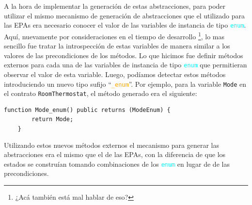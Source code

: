 A la hora de implementar la generación de estas abstracciones, para poder utilizar el mismo mecanismo de generación de abstracciones que el utilizado para las EPAs era necesario conocer el valor de las variables de instancia de tipo \textcolor{cyan}{\texttt{enum}}.
Aquí, nuevamente por consideraciones en el tiempo de desarrollo \footnote{¿Acá también está mal hablar de eso?}, lo mas sencillo fue tratar la introspección de estas variables de manera similar a los valores de las precondiciones de los métodos.
Lo que hicimos fue definir métodos externos para cada una de las variables de instancia de tipo \textcolor{cyan}{\texttt{enum}} que permitieran observar el valor de esta variable.
Luego, podíamos detectar estos métodos introduciendo un nuevo tipo sufijo ``\textcolor{orange}{\texttt{\_enum}}''.
Por ejemplo, para la variable \texttt{Mode} en el contrato \texttt{RoomThermostat}, el método generado era el siguiente:

\begin{lstlisting}[language=Solidity]
    function Mode_enum() public returns (ModeEnum) {
        return Mode;
    }
\end{lstlisting}

Utilizando estos nuevos métodos externos el mecanismo para generar las abstracciones era el mismo que el de las EPAs, con la diferencia de que los estados se construían tomando combinaciones de los \textcolor{cyan}{\texttt{enum}} en lugar de de las precondiciones.
